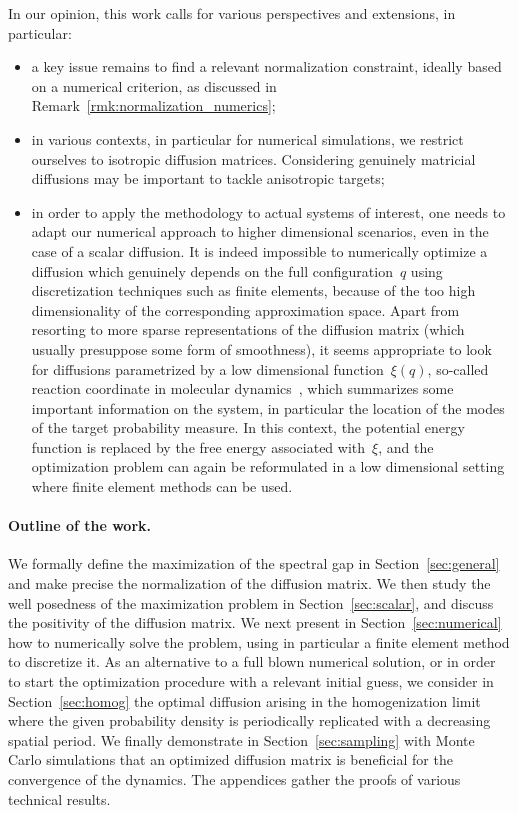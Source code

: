 \documentclass{article}
\begin{document}
In our opinion, this work calls for various perspectives and extensions, in particular:
\begin{itemize}
\item a key issue remains to find a relevant normalization constraint, ideally based on a numerical criterion, as discussed in Remark~\ref{rmk:normalization_numerics};
\item in various contexts, in particular for numerical simulations, we restrict ourselves to isotropic diffusion matrices. Considering genuinely matricial diffusions may be important to tackle anisotropic targets;
\item in order to apply the methodology to actual systems of interest, one needs to adapt our numerical approach to higher dimensional scenarios, even in the case of a scalar diffusion. It is indeed impossible to numerically optimize a diffusion which genuinely depends on the full configuration~$q$ using discretization techniques such as finite elements, because of the too high dimensionality of the corresponding approximation space. Apart from resorting to more sparse representations of the diffusion matrix (which usually presuppose some form of smoothness), it seems appropriate to look for diffusions parametrized by a low dimensional function~$\xi(q)$, so-called reaction coordinate in molecular dynamics~\cite{LRS10}, which summarizes some important information on the system, in particular the location of the modes of the target probability measure. In this context, the potential energy function is replaced by the free energy associated with~$\xi$, and the optimization problem can again be reformulated in a low dimensional setting where finite element methods can be used.
\end{itemize}

\paragraph{Outline of the work.}
We formally define the maximization of the spectral gap in Section~\ref{sec:general} and make precise the normalization of the diffusion matrix. We then study the well posedness of the maximization problem in Section~\ref{sec:scalar}, and discuss the positivity of the diffusion matrix. We next present in Section~\ref{sec:numerical} how to numerically solve the problem, using in particular a finite element method to discretize it. As an alternative to a full blown numerical solution, or in order to start the optimization procedure with a relevant initial guess, we consider in Section~\ref{sec:homog} the optimal diffusion arising in the homogenization limit where the given probability density is periodically replicated with a decreasing spatial period. We finally demonstrate in Section~\ref{sec:sampling} with Monte Carlo simulations that an optimized diffusion matrix is beneficial for the convergence of the dynamics. The appendices gather the proofs of various technical results.
\end{document}
